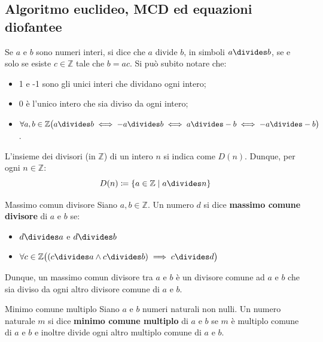 \subsection{Algoritmo euclideo, MCD ed equazioni diofantee}
Se $a$ e $b$ sono numeri interi, si dice che $a$ divide $b$, in simboli $a \divides b$, se e solo se esiste $c \in \mathbb{Z}$ tale che $b=ac$. Si può subito notare che:
\begin{itemize}
	\item 1 e -1 sono gli unici interi che dividano ogni intero;
	\item 0 è l'unico intero che sia diviso da ogni intero;
	\item $\forall a,b \in \mathbb{Z} \bigl( a \divides b \iff -a \divides b \iff a \divides -b \iff -a \divides -b \bigr)$.
\end{itemize}
L'insieme dei divisori (in $\mathbb{Z}$) di un intero $n$ si indica come $D(n)$. Dunque, per ogni $n \in \mathbb{Z}$:
\begin{equation}
	D(n) \coloneqq \{a \in \mathbb{Z} \; | \; a \divides n \}
\end{equation}
\begin{defbox}{Massimo comun divisore}
	Siano $a,b \in \mathbb{Z}$. Un numero $d$ si dice \textbf{massimo comune divisore} di $a$ e $b$ se:
	\begin{itemize}
		\item $d \divides a$ e $d \divides b$
		\item $\forall c \in \mathbb{Z} \bigl((c \divides a \land c \divides b) \implies c \divides d \bigr)$
	\end{itemize}
	Dunque, un massimo comun divisore tra $a$ e $b$ è un divisore comune ad $a$ e $b$ che sia diviso da ogni altro divisore comune di $a$ e $b$.
\end{defbox}

\begin{defbox}{Minimo comune multiplo}
	Siano $a$ e $b$ numeri naturali non nulli. Un numero naturale $m$ si dice \textbf{minimo comune multiplo} di $a$ e $b$ se $m$ è multiplo comune di $a$ e $b$ e inoltre divide ogni altro multiplo comune di $a$ e $b$.
\end{defbox}


